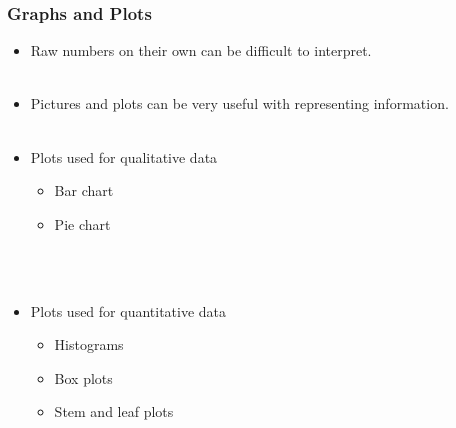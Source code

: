 \documentclass[xcolor=svgnames, compress]{beamer}
\begin{document}
\begin{frame}
\frametitle{Graphs and Plots}


\begin{itemize}
\justifying
\item	Raw numbers on their own can be difficult to interpret. \\
\hfill\\
\item	Pictures and plots can be very useful with representing information. \\
\hfill\\
\item	Plots used for \alert{qualitative data}
	\begin{itemize}
	\item	Bar chart
	\item	Pie chart\\
	\end{itemize}
\hfill\\
\hfill\\
\item	Plots used for \alert{quantitative} data
	\begin{itemize}
	\item	Histograms
	\item	Box plots
	\item Stem and leaf plots
	\end{itemize}
\end{itemize}

\end{frame}





\end{document}
